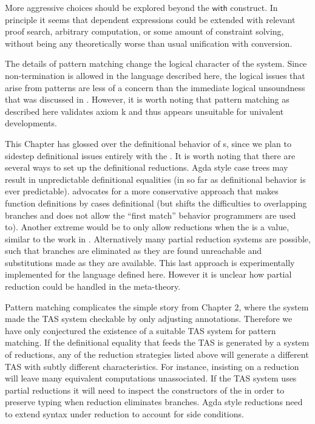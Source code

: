 More aggressive choices should be explored beyond the $\mathsf{with}$ construct.
In principle it seems that dependent \case{} expressions could be extended with relevant proof search, arbitrary computation, or some amount of constraint solving, without being any theoretically worse than usual unification with conversion. 



The details of pattern matching change the logical character of the system\cite{cockx_devriese_2018}.
Since non-termination is allowed in the language described here, the logical issues that arise from patterns are less of a concern than the immediate logical unsoundness that was discussed in .
However, it is worth noting that pattern matching as described here validates axiom k and thus appears unsuitable for univalent developments.%

This Chapter has glossed over the definitional behavior of \case{}s, since we plan to sidestep definitional issues entirely with the \clang{}.
It is worth noting that there are several ways to set up the definitional reductions.
Agda style case trees may result in unpredictable definitional equalities (in so far as definitional behavior is ever predictable).
\cite{10.1007/978-3-642-54833-8_6} advocates for a more conservative approach that makes function definitions by cases definitional (but shifts the difficulties to overlapping branches and does not allow the ``first match'' behavior programmers are used to).
Another extreme would be to only allow reductions when the \scrut{} is a value, similar to the work in \cite{sjoberg2012irrelevance}.
Alternatively many partial reduction systems are possible, such that branches are eliminated as they are found unreachable and substitutions made as they are available.
This last approach is experimentally implemented for the language defined here.
However it is unclear how partial reduction could be handled in the meta-theory.

Pattern matching complicates the simple story from Chapter 2, where the \bidir{} system made the TAS system checkable by only adjusting annotations.
Therefore we have only conjectured the existence of a suitable TAS system for pattern matching.
If the definitional equality that feeds the TAS is generated by a system of reductions, any of the reduction strategies listed above will generate a different TAS with subtly different characteristics.
For instance, insisting on a \cbv{} \case{} reduction will leave many equivalent computations unassociated.
If the TAS system uses partial reductions it will need to inspect the constructors of the \scrut{} in order to preserve typing when reduction eliminates branches.
Agda style reductions need to extend syntax under reduction to account for side conditions. 

